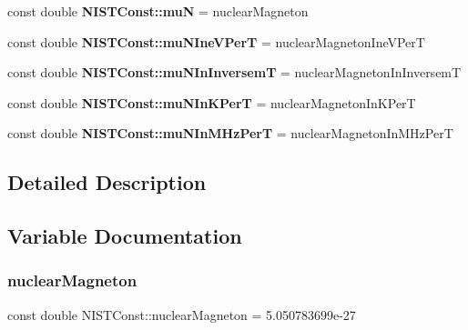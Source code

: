 \begin{DoxyCompactItemize}
\item 
\mbox{\label{group___nuclear_magneton_ga5b19bcb311479cc6f5c36b551356e580}} 
const double {\bfseries N\+I\+S\+T\+Const\+::muN} = nuclear\+Magneton
\item 
\mbox{\label{group___nuclear_magneton_ga2c8a56a6542df06b37fed3b2b5444ff6}} 
const double {\bfseries N\+I\+S\+T\+Const\+::mu\+N\+Ine\+V\+PerT} = nuclear\+Magneton\+Ine\+V\+PerT
\item 
\mbox{\label{group___nuclear_magneton_ga9c4499c279614bf4bb837c9c4c74b208}} 
const double {\bfseries N\+I\+S\+T\+Const\+::mu\+N\+In\+InversemT} = nuclear\+Magneton\+In\+InversemT
\item 
\mbox{\label{group___nuclear_magneton_gaca6a801a34347be9fd04e7882187484c}} 
const double {\bfseries N\+I\+S\+T\+Const\+::mu\+N\+In\+K\+PerT} = nuclear\+Magneton\+In\+K\+PerT
\item 
\mbox{\label{group___nuclear_magneton_ga4c2e37b42112c282a0dc5969f351187e}} 
const double {\bfseries N\+I\+S\+T\+Const\+::mu\+N\+In\+M\+Hz\+PerT} = nuclear\+Magneton\+In\+M\+Hz\+PerT
\end{DoxyCompactItemize}


\subsection{Detailed Description}


\subsection{Variable Documentation}
\mbox{\label{group___nuclear_magneton_gacf9b0d2a2517113d30300e4ed7b56cc7}} 
\subsubsection{\texorpdfstring{nuclear\+Magneton}{nuclearMagneton}}
{\footnotesize\ttfamily const double N\+I\+S\+T\+Const\+::nuclear\+Magneton = 5.\+050783699e-\/27}

